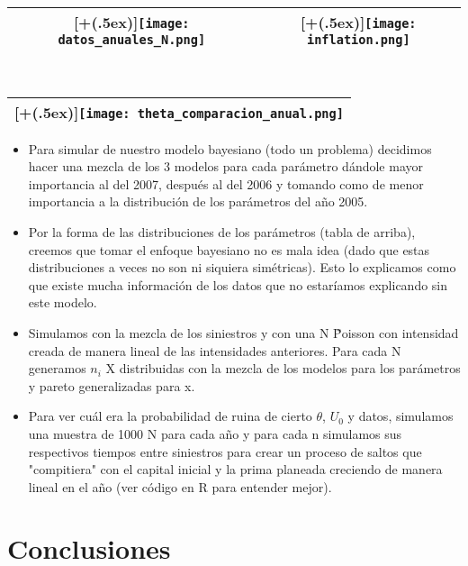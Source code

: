 \documentclass[DIV=calc, 
					paper=letter, 
					fontsize=11pt, 
					twocolumn]{scrartcl}
\newcommand*{\addheight}[2][.5ex]{%
  \raisebox{0pt}[\dimexpr\height+(#1)\relax]{#2}%
}
\begin{document}
\begin{tabular}{|c|c|}
      \hline
      \addheight{\texttt{[image: datos\_anuales\_N.png]}} &
       \addheight{\texttt{[image: inflation.png]}}\\
      \hline
      \hline
\end{tabular}\\

\begin{tabular}{|c|}
	\hline
  	\addheight{\texttt{[image: theta\_comparacion\_anual.png]}}\\
	\hline
\end{tabular}

\begin{itemize}
\item Para simular de nuestro modelo bayesiano (todo un problema) decidimos hacer una mezcla de los 3 modelos para cada par\'ametro d\'andole mayor importancia al del 2007, despu\'es al del 2006 y tomando como de menor importancia a la distribuci\'on de los par\'ametros del a\~{n}o 2005.
\item Por la forma de las distribuciones de los par\'ametros (tabla de arriba), creemos que tomar el enfoque bayesiano no es mala idea (dado que estas distribuciones a veces no son ni siquiera sim\'etricas). Esto lo explicamos como que existe mucha informaci\'on de los datos que no estar\'iamos explicando sin este modelo. 
\item Simulamos con la mezcla de los siniestros y con una N \~ Poisson con intensidad creada de manera lineal de las intensidades anteriores. Para cada N generamos $n_i$ X distribuidas con la mezcla de los modelos para los par\'ametros y pareto generalizadas para x.
\item Para ver cu\'al era la probabilidad de ruina de cierto $\theta$, $U_0$ y datos, simulamos una muestra de 1000 N para cada a\~{n}o y para cada n simulamos sus respectivos tiempos entre siniestros para crear un proceso de saltos que "compitiera" con el capital inicial y la prima planeada creciendo de manera lineal en el a\~{n}o (ver c\'odigo en R para entender mejor).
\end{itemize}
\section{Conclusiones}
\end{document}
